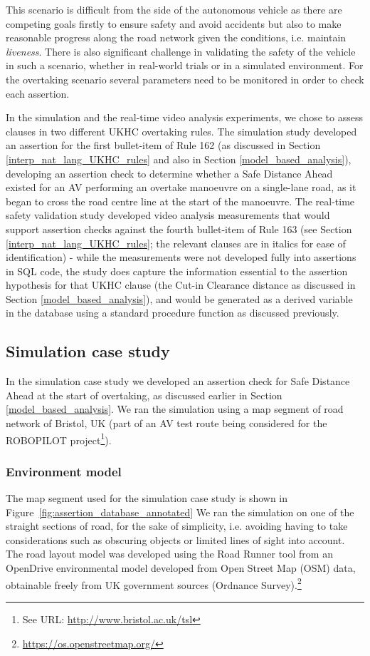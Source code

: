 This scenario is difficult from the side of the autonomous vehicle as there are competing goals firstly to ensure safety and avoid accidents but also to make reasonable progress along the road network given the conditions, i.e. maintain \textit{liveness}. There is also significant challenge in validating the safety of the vehicle in such a scenario, whether in real-world trials or in a simulated environment. For the overtaking scenario several parameters need to be monitored in order to check each assertion. 

In the simulation and the real-time video analysis experiments, we chose to assess clauses in two different UKHC overtaking rules. The simulation study developed an assertion for the first bullet-item of Rule 162 (as discussed in Section \ref{interp_nat_lang_UKHC_rules} and also in Section \ref{model_based_analysis}), developing an assertion check to determine whether a Safe Distance Ahead existed for an AV performing an overtake manoeuvre on a single-lane road, as it began to cross the road centre line at the start of the manoeuvre. The real-time safety validation study developed video analysis measurements that would support assertion checks against the fourth bullet-item of Rule 163 (see Section \ref{interp_nat_lang_UKHC_rules}; the relevant clauses are in italics for ease of identification) - while the measurements were not developed fully into assertions in SQL code, the study does capture the information essential to the assertion hypothesis for that UKHC clause (the Cut-in Clearance distance as discussed in Section \ref{model_based_analysis}), and would be generated as a derived variable in the database using a standard procedure function as discussed previously.

\subsection{Simulation case study}  \label{sim_case_study}
In the simulation case study we developed an assertion check for Safe Distance Ahead at the start of overtaking, as discussed earlier in Section \ref{model_based_analysis}. We ran the simulation using a map segment of road network of Bristol, UK (part of an AV test route being considered for the ROBOPILOT project\footnote{See URL: \url{http://www.bristol.ac.uk/tsl}}).

\subsubsection{Environment model}
The map segment used for the simulation case study is shown in 
Figure~\ref{fig:assertion_database_annotated}
We ran the simulation on one of the straight sections of road, for the sake of simplicity, i.e. avoiding having to take considerations such as obscuring objects or limited lines of sight into account. The road layout model was developed using the Road Runner tool from an OpenDrive environmental model developed from Open Street Map (OSM) data, obtainable freely from UK government sources (Ordnance Survey).\footnote{\url{https://os.openstreetmap.org/}} 

